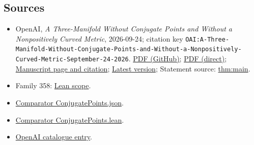 \documentclass[11pt]{article}
\begin{document}
\subsection{Sources}
\begin{itemize}
\item OpenAI, \emph{A Three-Manifold Without Conjugate Points and Without a Nonpositively Curved Metric}, 2026-09-24; citation key \texttt{OAI:A-Three-Manifold-Without-Conjugate-Points-and-Without-a-Nonpositively-Curved-Metric-September-24-2026}. \href{https://github.com/openai/math/blob/adc7f1241b42e322a6451854ab7e4b4c146bf78a/preprints/A-Three-Manifold-Without-Conjugate-Points-and-Without-a-Nonpositively-Curved-Metric-September-24-2026/paper.pdf}{PDF (GitHub)}; \href{https://github.com/openai/math/raw/adc7f1241b42e322a6451854ab7e4b4c146bf78a/preprints/A-Three-Manifold-Without-Conjugate-Points-and-Without-a-Nonpositively-Curved-Metric-September-24-2026/paper.pdf}{PDF (direct)}; \href{https://github.com/openai/math/blob/adc7f1241b42e322a6451854ab7e4b4c146bf78a/preprints/A-Three-Manifold-Without-Conjugate-Points-and-Without-a-Nonpositively-Curved-Metric-September-24-2026/README.md}{Manuscript page and citation}; \href{https://github.com/openai/math/blob/main/preprints/A-Three-Manifold-Without-Conjugate-Points-and-Without-a-Nonpositively-Curved-Metric-September-24-2026/paper.pdf}{Latest version}; Statement source: \href{https://github.com/openai/math/blob/adc7f1241b42e322a6451854ab7e4b4c146bf78a/preprints/A-Three-Manifold-Without-Conjugate-Points-and-Without-a-Nonpositively-Curved-Metric-September-24-2026/build/sections/introduction.tex\#L27}{thm:main}.
\item Family 358: \href{https://github.com/openai/math/blob/adc7f1241b42e322a6451854ab7e4b4c146bf78a/lean/docs/358.md}{Lean scope}.
\item \href{https://github.com/openai/math/blob/adc7f1241b42e322a6451854ab7e4b4c146bf78a/lean/ComparatorChallenges/ConjugatePoints.json}{Comparator ConjugatePoints.json}.
\item \href{https://github.com/openai/math/blob/adc7f1241b42e322a6451854ab7e4b4c146bf78a/lean/ComparatorChallenges/ConjugatePoints.lean}{Comparator ConjugatePoints.lean}.
\item \href{https://github.com/openai/math/blob/adc7f1241b42e322a6451854ab7e4b4c146bf78a/CONTENTS.md}{OpenAI catalogue entry}.
\end{itemize}
\end{document}
